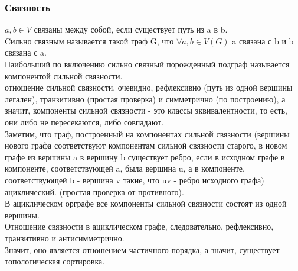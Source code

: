 \subsubsection{Связность}
$a, b \in V$ связаны между собой, если существует путь из a в b.\\
Cильно связным называется такой граф G, что $\forall a, b \in V(G)$ a связана с b и b связана с a.\\
Наибольший по включению сильно связный порожденный подграф называется компонентой сильной связности.\\
отношение сильной связности, очевидно, рефлексивно (путь из одной вершины легален), транзитивно (простая проверка) и симметрично (по построению), а значит, компоненты сильной связности - это классы эквивалентности, то есть, они либо не пересекаются, либо совпадают.\\
Заметим, что граф, построенный на компонентах сильной связности (вершины нового графа соответствуют компонентам сильной связности старого, в новом графе из вершины a в вершину b существует ребро, если в исходном графе в компоненте, соответствующей a, была вершина u, а в компоненте, соответствующей b - вершина v такие, что uv - ребро исходного графа) ациклический. (простая проверка от противного).\\
В ациклическом орграфе все компоненты сильной связности состоят из одной вершины.\\
Отношение связности в ациклическом графе, следовательно, рефлексивно, транзитивно и антисимметрично.\\
Значит, оно является отношением частичного порядка, а значит, существует топологическая сортировка.